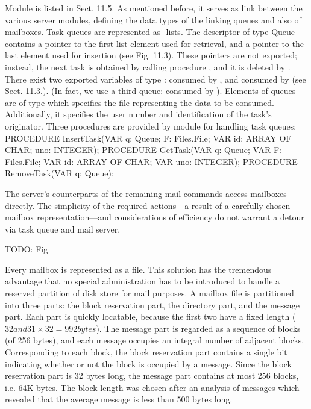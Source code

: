 Module  is listed in Sect. 11.5. As mentioned before, it serves as link between the various server modules, defining the data types of the linking queues and also of mailboxes. Task queues are represented as -lists. The descriptor of type Queue contains a pointer to the first list element used for retrieval, and a pointer to the last element used for insertion (see Fig. 11.3). These pointers are not exported; instead, the next task is obtained by calling procedure , and it is deleted by . There exist two exported variables of type :  consumed by , and  consumed by  (see Sect. 11.3.). (In fact, we use a third queue:  consumed by ). Elements of queues are of type  which specifies the file representing the data to be consumed. Additionally, it specifies the user number and identification of the task's originator. Three procedures are provided by module  for handling task queues:
\begintt
PROCEDURE InsertTask(VAR q: Queue; F: Files.File; VAR id: ARRAY OF CHAR; uno: INTEGER);
PROCEDURE GetTask(VAR q: Queue; VAR F: Files.File; VAR id: ARRAY OF CHAR; VAR uno: INTEGER);
PROCEDURE RemoveTask(VAR q: Queue);
\endtt

\noindent The server's counterparts of the remaining mail commands access mailboxes directly. The simplicity of the required actions---a result of a carefully chosen mailbox representation---and considerations of efficiency do not warrant a detour via task queue and mail server.

TODO: Fig

Every mailbox is represented as a file. This solution has the tremendous advantage that no special administration has to be introduced to handle a reserved partition of disk store for mail purposes. A mailbox file is partitioned into three parts: the block reservation part, the directory part, and the message part. Each part is quickly locatable, because the first two have a fixed length ($32 and 31 \times 32 = 992 bytes$). The message part is regarded as a sequence of blocks (of 256 bytes), and each message occupies an integral number of adjacent blocks. Corresponding to each block, the block reservation part contains a single bit indicating whether or not the block is occupied by a message. Since the block reservation part is 32 bytes long, the message part contains at most 256 blocks, i.e. 64K bytes. The block length was chosen after an analysis of messages which revealed that the average message is less than 500 bytes long.


